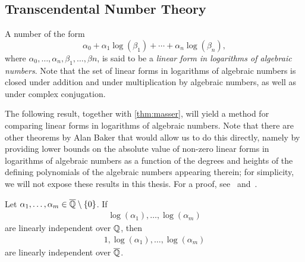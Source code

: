 \subsection{Transcendental Number Theory}


A number of the form
\begin{equation*}
  \alpha_{0} + \alpha_{1} \log(\beta_{1}) + \cdots + \alpha_{n} \log(\beta_{n}),
\end{equation*}
where $\alpha_{0}, \ldots, \alpha_{n}, \beta_{1}, \ldots, \beta{n}$, is said to be a \emph{linear form in logarithms of algebraic numbers}. Note that the set of linear forms in logarithms of algebraic numbers is closed under addition and under multiplication by algebraic numbers, as well as under complex conjugation.

The following result, together with \cref{thm:masser}, will yield a method for comparing linear forms in logarithms of algebraic numbers. Note that there are other theorems by Alan Baker that would allow us to do this directly, namely by providing lower bounds on the absolute value of non-zero linear forms in logarithms of algebraic numbers as a function of the degrees and heights of the defining polynomials of the algebraic numbers appearing therein; for simplicity, we will not expose these results in this thesis. For a proof, see~\cite{Baker75} and~\cite{BW93}.

\begin{theorem}[Baker]
\label{thm:Baker}
Let $\alpha_{1}, \ldots, \alpha_{m} \in \overline{\mathbb{Q}} \setminus \lbrace 0 \rbrace$. If
\begin{align*}
\log(\alpha_{1}), \ldots, \log(\alpha_{m})
\end{align*}
are linearly independent over $\mathbb{Q}$, then
\begin{align*}
1, \log(\alpha_{1}), \ldots, \log(\alpha_{m})
\end{align*}
are linearly independent over $\overline{\mathbb{Q}}$.
\end{theorem}


